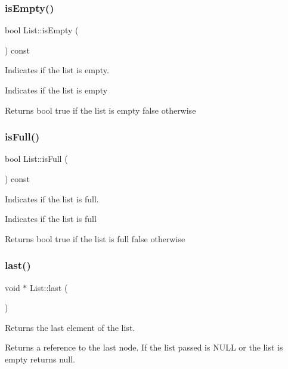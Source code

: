 \subsubsection{\texorpdfstring{is\+Empty()}{isEmpty()}}
{\footnotesize\ttfamily bool List\+::is\+Empty (\begin{DoxyParamCaption}{ }\end{DoxyParamCaption}) const}



Indicates if the list is empty. 

Indicates if the list is empty

\begin{DoxyReturn}{Returns}
bool true if the list is empty false otherwise 
\end{DoxyReturn}
\mbox{\label{class_list_a4b912e9b1947dac3dfeb72623206b24e}} 
\subsubsection{\texorpdfstring{is\+Full()}{isFull()}}
{\footnotesize\ttfamily bool List\+::is\+Full (\begin{DoxyParamCaption}{ }\end{DoxyParamCaption}) const}



Indicates if the list is full. 

Indicates if the list is full

\begin{DoxyReturn}{Returns}
bool true if the list is full false otherwise 
\end{DoxyReturn}
\mbox{\label{class_list_ae9f050eea6ba25f96ebe89e7abf820c7}} 
\subsubsection{\texorpdfstring{last()}{last()}}
{\footnotesize\ttfamily void $\ast$ List\+::last (\begin{DoxyParamCaption}{ }\end{DoxyParamCaption})}



Returns the last element of the list. 

Returns a reference to the last node. If the list passed is N\+U\+LL or the list is empty returns null.

